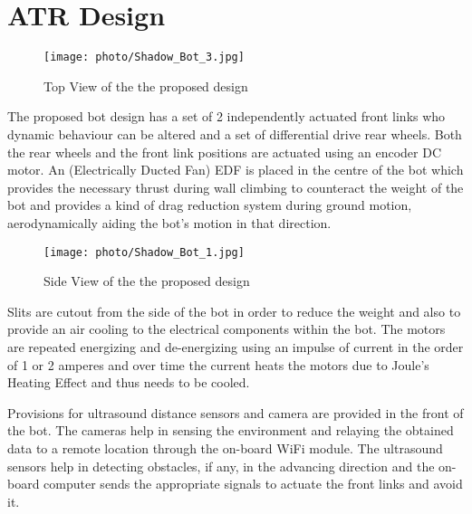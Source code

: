 \section{ATR Design}
\begin{figure}
  \begin{center}
  \texttt{[image: photo/Shadow\_Bot\_3.jpg]}\\
  \caption{Top View of the the proposed design}\label{top_view}
  \end{center}
\end{figure}
The proposed bot design has a set of 2 independently actuated front links who dynamic behaviour can be altered and a set of differential drive rear wheels. Both the rear wheels and the front link positions are actuated using an encoder DC motor. An (Electrically Ducted Fan) EDF is placed in the centre of the bot which provides the necessary thrust during wall climbing to counteract the weight of the bot and provides a kind of drag reduction system during ground motion, aerodynamically aiding the bot's motion in that direction.


\begin{figure}
  \begin{center}
  \texttt{[image: photo/Shadow\_Bot\_1.jpg]}\\
  \caption{Side View of the the proposed design}\label{side_view}
  \end{center}
\end{figure}

Slits are cutout from the side of the bot in order to reduce the weight and also to provide an air cooling to the electrical components within the bot. The motors are repeated energizing and de-energizing using an impulse of current in the order of 1 or 2 amperes and over time the current heats the motors due to Joule's Heating Effect and thus needs to be cooled.

Provisions for ultrasound distance sensors and camera are provided in the front of the bot. The cameras help in sensing the environment and relaying the obtained data to a remote location through the on-board WiFi module. The ultrasound sensors help in detecting obstacles, if any, in the advancing direction and the on-board computer sends the appropriate signals to actuate the front links and avoid it.
